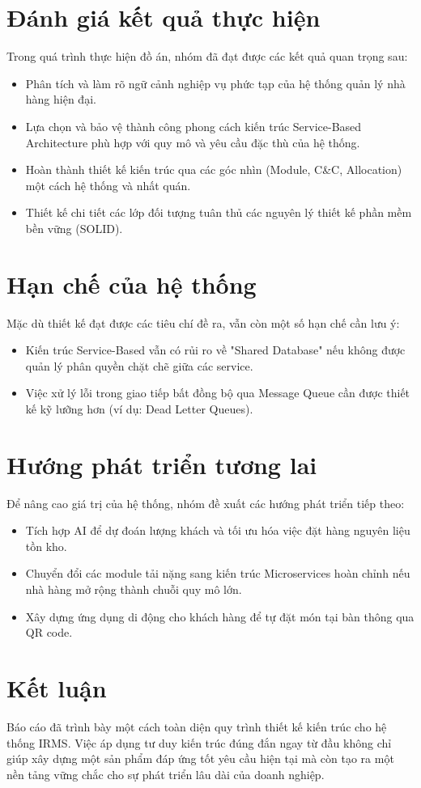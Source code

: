 \section{Đánh giá kết quả thực hiện}
Trong quá trình thực hiện đồ án, nhóm đã đạt được các kết quả quan trọng sau:
\begin{itemize}
    \item Phân tích và làm rõ ngữ cảnh nghiệp vụ phức tạp của hệ thống quản lý nhà hàng hiện đại.
    \item Lựa chọn và bảo vệ thành công phong cách kiến trúc Service-Based Architecture phù hợp với quy mô và yêu cầu đặc thù của hệ thống.
    \item Hoàn thành thiết kế kiến trúc qua các góc nhìn (Module, C\&C, Allocation) một cách hệ thống và nhất quán.
    \item Thiết kế chi tiết các lớp đối tượng tuân thủ các nguyên lý thiết kế phần mềm bền vững (SOLID).
\end{itemize}

\section{Hạn chế của hệ thống}
Mặc dù thiết kế đạt được các tiêu chí đề ra, vẫn còn một số hạn chế cần lưu ý:
\begin{itemize}
    \item Kiến trúc Service-Based vẫn có rủi ro về "Shared Database" nếu không được quản lý phân quyền chặt chẽ giữa các service.
    \item Việc xử lý lỗi trong giao tiếp bất đồng bộ qua Message Queue cần được thiết kế kỹ lưỡng hơn (ví dụ: Dead Letter Queues).
\end{itemize}

\section{Hướng phát triển tương lai}
Để nâng cao giá trị của hệ thống, nhóm đề xuất các hướng phát triển tiếp theo:
\begin{itemize}
    \item Tích hợp AI để dự đoán lượng khách và tối ưu hóa việc đặt hàng nguyên liệu tồn kho.
    \item Chuyển đổi các module tải nặng sang kiến trúc Microservices hoàn chỉnh nếu nhà hàng mở rộng thành chuỗi quy mô lớn.
    \item Xây dựng ứng dụng di động cho khách hàng để tự đặt món tại bàn thông qua QR code.
\end{itemize}

\section{Kết luận}
Báo cáo đã trình bày một cách toàn diện quy trình thiết kế kiến trúc cho hệ thống IRMS. Việc áp dụng tư duy kiến trúc đúng đắn ngay từ đầu không chỉ giúp xây dựng một sản phẩm đáp ứng tốt yêu cầu hiện tại mà còn tạo ra một nền tảng vững chắc cho sự phát triển lâu dài của doanh nghiệp.
